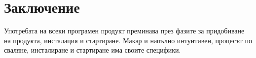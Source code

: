 \section*{Заключение}

Употребата на всеки програмен продукт преминава през фазите за придобиване на продукта, инсталация и стартиране. Макар и напълно интуитивен, процесът по сваляне, инсталиране и стартиране има своите специфики. 

